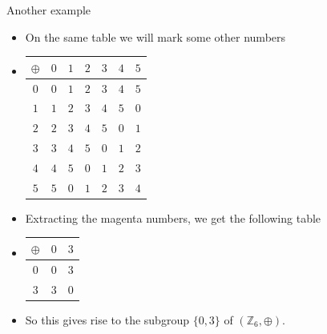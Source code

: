 \documentclass[ %
 10pt, xcolor={dvipsnames,svgnames,x11names,hyperref},
   hyperref={colorlinks=true,citecolor=green,linkcolor=DarkRed,urlcolor=ProcessBlue,anchorcolor=blue}
  ]{beamer}
\newenvironment{stepitemize}{\begin{itemize}[<+->]}{\end{itemize} }
\newcommand{\Z}{\mathbb{Z}}
\begin{document}
\begin{frame}{Another example}
\begin{stepitemize}
\item On the same table we will mark some other numbers
\item[]
\begin{table}[H]
\begin{tabular}{ c| c | c |c|c|c|c}
$\oplus$  & {\color{magenta} $0$} & $1$ & $2$ & {\color{magenta} $3$} &  $4$ & $5$\\
\hline
{\color{magenta} $0$}&{\color{magenta} $0$} & $1$ & $2$ & {\color{magenta} $3$} & $4$ & $5$\\
\hline
$1$&$1$ & $2$ & $3$ & $4$ & $5$ & $0$\\
\hline
 $2$ & $2$ & $3$ & $4$ & $5$ &  $0$ & $1$\\
\hline
{\color{magenta} $3$}& {\color{magenta} $3$} & $4$ & $5$ & {\color{magenta} $0$} & $1$ & $2$\\
\hline
$4$& $4$ & $5$ &  $0$ & $1$ &  $2$ & $3$\\
\hline
$5$&$5$ & $0$ & $1$ & $2$ & $3$ & $4$\\
\end{tabular}
\end{table}
\item Extracting the magenta numbers, we get the following table
\item[]
\begin{table}[H]
\begin{tabular}{ c| c | c}
$\oplus$  & {\color{magenta} $0$} & {\color{magenta} $3$} \\
\hline
{\color{magenta} $0$}&{\color{magenta} $0$} & {\color{magenta} $3$}\\
\hline
{\color{magenta} $3$} &{\color{magenta} $3$} & {\color{magenta} $0$}
\end{tabular}
\end{table}
\item So this gives rise to the subgroup $\{0,3\}$ of $(\Z_6, \oplus)$. 
\end{stepitemize}
    
\end{frame}
\end{document}
